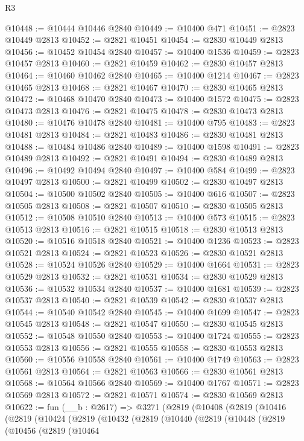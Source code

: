 \begin{lexlean}{R3}
\begin{coremodule}
@10448 := @10444 @10446 @2840
@10449 := @10400 @471
@10451 := @2823 @10449 @2813
@10452 := @2821 @10451
@10454 := @2830 @10449 @2813
@10456 := @10452 @10454 @2840
@10457 := @10400 @1536
@10459 := @2823 @10457 @2813
@10460 := @2821 @10459
@10462 := @2830 @10457 @2813
@10464 := @10460 @10462 @2840
@10465 := @10400 @1214
@10467 := @2823 @10465 @2813
@10468 := @2821 @10467
@10470 := @2830 @10465 @2813
@10472 := @10468 @10470 @2840
@10473 := @10400 @1572
@10475 := @2823 @10473 @2813
@10476 := @2821 @10475
@10478 := @2830 @10473 @2813
@10480 := @10476 @10478 @2840
@10481 := @10400 @795
@10483 := @2823 @10481 @2813
@10484 := @2821 @10483
@10486 := @2830 @10481 @2813
@10488 := @10484 @10486 @2840
@10489 := @10400 @1598
@10491 := @2823 @10489 @2813
@10492 := @2821 @10491
@10494 := @2830 @10489 @2813
@10496 := @10492 @10494 @2840
@10497 := @10400 @584
@10499 := @2823 @10497 @2813
@10500 := @2821 @10499
@10502 := @2830 @10497 @2813
@10504 := @10500 @10502 @2840
@10505 := @10400 @616
@10507 := @2823 @10505 @2813
@10508 := @2821 @10507
@10510 := @2830 @10505 @2813
@10512 := @10508 @10510 @2840
@10513 := @10400 @573
@10515 := @2823 @10513 @2813
@10516 := @2821 @10515
@10518 := @2830 @10513 @2813
@10520 := @10516 @10518 @2840
@10521 := @10400 @1236
@10523 := @2823 @10521 @2813
@10524 := @2821 @10523
@10526 := @2830 @10521 @2813
@10528 := @10524 @10526 @2840
@10529 := @10400 @1664
@10531 := @2823 @10529 @2813
@10532 := @2821 @10531
@10534 := @2830 @10529 @2813
@10536 := @10532 @10534 @2840
@10537 := @10400 @1681
@10539 := @2823 @10537 @2813
@10540 := @2821 @10539
@10542 := @2830 @10537 @2813
@10544 := @10540 @10542 @2840
@10545 := @10400 @1699
@10547 := @2823 @10545 @2813
@10548 := @2821 @10547
@10550 := @2830 @10545 @2813
@10552 := @10548 @10550 @2840
@10553 := @10400 @1724
@10555 := @2823 @10553 @2813
@10556 := @2821 @10555
@10558 := @2830 @10553 @2813
@10560 := @10556 @10558 @2840
@10561 := @10400 @1749
@10563 := @2823 @10561 @2813
@10564 := @2821 @10563
@10566 := @2830 @10561 @2813
@10568 := @10564 @10566 @2840
@10569 := @10400 @1767
@10571 := @2823 @10569 @2813
@10572 := @2821 @10571
@10574 := @2830 @10569 @2813
@10622 := fun (__b : @2617) =>
  @3271
    (@2819
      (@10408
        (@2819
          (@10416
            (@2819
              (@10424
                (@2819
                  (@10432
                    (@2819
                      (@10440
                        (@2819
                          (@10448
                            (@2819
                              (@10456
                                (@2819
                                  (@10464

\end{coremodule}
\end{lexlean}
